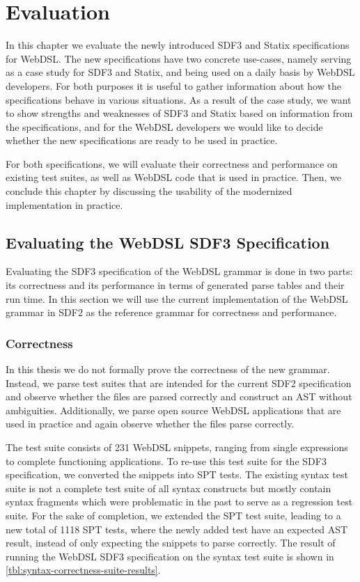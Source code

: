 
\chapter{\label{chap:evaluation}Evaluation}

In this chapter we evaluate the newly introduced SDF3 and Statix specifications for WebDSL. The new specifications have two concrete use-cases, namely serving as a case study for SDF3 and Statix, and being used on a daily basis by WebDSL developers. For both purposes it is useful to gather information about how the specifications behave in various situations. As a result of the case study, we want to show strengths and weaknesses of SDF3 and Statix based on information from the specifications, and for the WebDSL developers we would like to decide whether the new specifications are ready to be used in practice.

For both specifications, we will evaluate their correctness and performance on existing test suites, as well as WebDSL code that is used in practice. Then, we conclude this chapter by discussing the usability of the modernized implementation in practice.

\section{\label{sec:eval-sdf3}Evaluating the WebDSL SDF3 Specification}

  Evaluating the SDF3 specification of the WebDSL grammar is done in two parts: its correctness and its performance in terms of generated parse tables and their run time. In this section we will use the current implementation of the WebDSL grammar in SDF2 as the reference grammar for correctness and performance.

  \subsection{Correctness}

    In this thesis we do not formally prove the correctness of the new grammar. Instead, we parse test suites that are intended for the current SDF2 specification and observe whether the files are parsed correctly and construct an AST without ambiguities. Additionally, we parse open source WebDSL applications that are used in practice and again observe whether the files parse correctly.

    The test suite consists of 231 WebDSL snippets, ranging from single expressions to complete functioning applications. To re-use this test suite for the SDF3 specification, we converted the snippets into SPT tests. The existing syntax test suite is not a complete test suite of all syntax constructs but mostly contain syntax fragments which were problematic in the past to serve as a regression test suite. For the sake of completion, we extended the SPT test suite, leading to a new total of 1118 SPT tests, where the newly added test have an expected AST result, instead of only expecting the snippets to parse correctly. The result of running the WebDSL SDF3 specification on the syntax test suite is shown in \cref{tbl:syntax-correctness-suite-results}.

